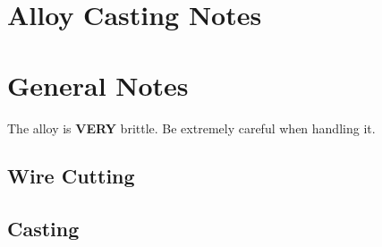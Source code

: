 \section{\MgZnCa Alloy Casting Notes}

\section{General Notes}
The \MgZnCa alloy is \textbf{VERY} brittle. Be extremely careful when handling it. 

\subsection{Wire Cutting}


\subsection{Casting}

